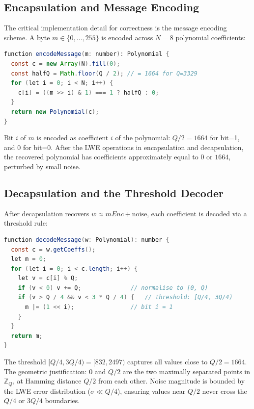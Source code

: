 \documentclass[12pt,a4paper]{report}
\begin{document}
\subsection{Encapsulation and Message Encoding}

The critical implementation detail for correctness is the message encoding scheme.
A byte $m \in \{0, \ldots, 255\}$ is encoded across $N = 8$ polynomial coefficients:

\begin{lstlisting}[language=Java, caption={Mini-Kyber message encoding},
                   label={lst:encode}]
function encodeMessage(m: number): Polynomial {
  const c = new Array(N).fill(0);
  const halfQ = Math.floor(Q / 2); // = 1664 for Q=3329
  for (let i = 0; i < N; i++) {
    c[i] = ((m >> i) & 1) === 1 ? halfQ : 0;
  }
  return new Polynomial(c);
}
\end{lstlisting}

Bit $i$ of $m$ is encoded as coefficient $i$ of the polynomial: $Q/2 = 1664$ for
bit=1, and $0$ for bit=0. After the LWE operations in encapsulation and decapsulation,
the recovered polynomial has coefficients approximately equal to $0$ or $1664$,
perturbed by small noise.

\subsection{Decapsulation and the Threshold Decoder}

After decapsulation recovers $w \approx \mathit{mEnc} + \text{noise}$, each
coefficient is decoded via a threshold rule:

\begin{lstlisting}[language=Java, caption={Mini-Kyber threshold decoder
(corrected)}, label={lst:decode}]
function decodeMessage(w: Polynomial): number {
  const c = w.getCoeffs();
  let m = 0;
  for (let i = 0; i < c.length; i++) {
    let v = c[i] % Q;
    if (v < 0) v += Q;              // normalise to [0, Q)
    if (v > Q / 4 && v < 3 * Q / 4) {   // threshold: [Q/4, 3Q/4)
      m |= (1 << i);                // bit i = 1
    }
  }
  return m;
}
\end{lstlisting}

The threshold $[Q/4, 3Q/4) = [832, 2497)$ captures all values close to $Q/2 = 1664$.
The geometric justification: $0$ and $Q/2$ are the two maximally separated points in
$\mathbb{Z}_Q$, at Hamming distance $Q/2$ from each other. Noise magnitude is bounded
by the LWE error distribution ($\sigma \ll Q/4$), ensuring values near $Q/2$ never
cross the $Q/4$ or $3Q/4$ boundaries.
\end{document}
